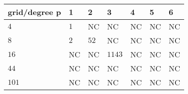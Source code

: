 \begin{tabular}{lllllll}
\hline
 grid/degree p   & 1   & 2    & 3      & 4   & 5   & 6   \\
\hline
 $4$             & $1$ & NC   & NC     & NC  & NC  & NC  \\
 $8$             & $2$ & $52$ & NC     & NC  & NC  & NC  \\
 $16$            & NC  & NC   & $1143$ & NC  & NC  & NC  \\
 $44$            & NC  & NC   & NC     & NC  & NC  & NC  \\
 $101$           & NC  & NC   & NC     & NC  & NC  & NC  \\
\hline
\end{tabular}